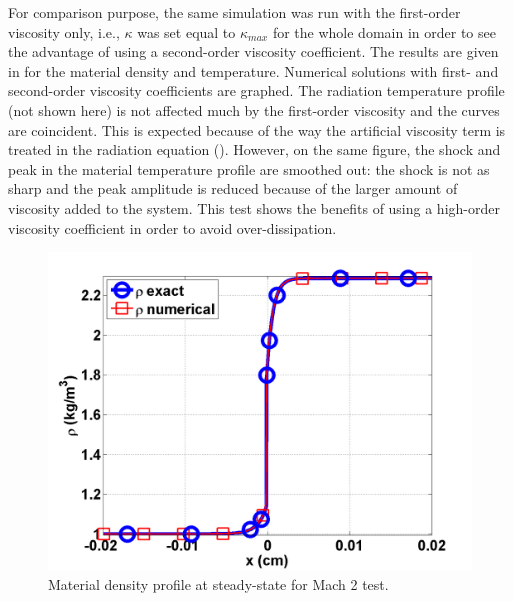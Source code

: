 For comparison purpose, the same simulation was run with the first-order viscosity only, i.e., $\kappa$ was set equal to $\kappa_{max}$ for the whole domain in order to see the advantage of using a second-order viscosity coefficient. The results are given in  for the material density and temperature. Numerical solutions with first- and second-order viscosity coefficients are graphed. The radiation temperature profile (not shown here) is not affected much by the first-order viscosity and the curves are coincident. This is expected because of the way the artificial viscosity term is treated in the radiation equation (). However, on the same figure, the shock and peak in the material temperature profile are smoothed out: the shock is not as sharp and the peak amplitude is reduced because of the larger amount of viscosity added to the system. This test shows the benefits of using a high-order viscosity coefficient in order to avoid over-dissipation.
\begin{figure}[H]
                \centering
                \includegraphics[width=\textwidth]{figures/Mach_2_nel_2000_density.png}
        \caption{Material density profile at steady-state for Mach 2 test.}\label{fig:Mach2_density}
\end{figure}
